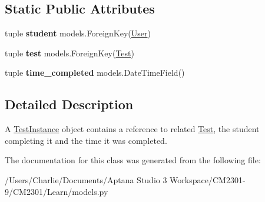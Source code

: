 \subsection*{Static Public Attributes}
\begin{DoxyCompactItemize}
\item 
\hypertarget{class_learn_1_1models_1_1_test_instance_aba775978ffaff379df4ce0efe21c733f}{tuple {\bfseries student} models.\-Foreign\-Key(\hyperlink{class_learn_1_1models_1_1_user}{User})}\label{class_learn_1_1models_1_1_test_instance_aba775978ffaff379df4ce0efe21c733f}

\item 
\hypertarget{class_learn_1_1models_1_1_test_instance_a85d5a67bc7a423519d5ecd8b8040e2e9}{tuple {\bfseries test} models.\-Foreign\-Key(\hyperlink{class_learn_1_1models_1_1_test}{Test})}\label{class_learn_1_1models_1_1_test_instance_a85d5a67bc7a423519d5ecd8b8040e2e9}

\item 
\hypertarget{class_learn_1_1models_1_1_test_instance_a5c6218cd0a6245c7ea3e55c3671c91e9}{tuple {\bfseries time\-\_\-completed} models.\-Date\-Time\-Field()}\label{class_learn_1_1models_1_1_test_instance_a5c6218cd0a6245c7ea3e55c3671c91e9}

\end{DoxyCompactItemize}


\subsection{Detailed Description}
A \hyperlink{class_learn_1_1models_1_1_test_instance}{Test\-Instance} object contains a reference to related \hyperlink{class_learn_1_1models_1_1_test}{Test}, the student completing it and the time it was completed. 

The documentation for this class was generated from the following file\-:\begin{DoxyCompactItemize}
\item 
/\-Users/\-Charlie/\-Documents/\-Aptana Studio 3 Workspace/\-C\-M2301-\/9/\-C\-M2301/\-Learn/models.\-py\end{DoxyCompactItemize}
